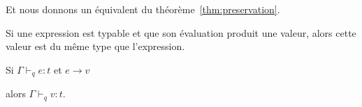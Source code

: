 


Et nous donnons un équivalent du théorème~\ref{thm:preservation}.

\begin{theorem}

  Si une expression est typable et que son évaluation produit une valeur, alors
  cette valeur est du même type que l'expression.

  Si $Γ ⊢_q e : t$ et $e → v$ %

  alors $Γ ⊢_q v : t$.

\end{theorem}

